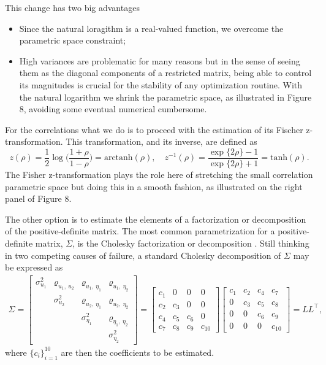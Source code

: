 This change has two big advantages
\begin{itemize}
 \item Since the natural loragithm is a real-valued function, we
       overcome the parametric space constraint;
 \item High variances are problematic for many reasons but in the sense
       of seeing them as the diagonal components of a restricted matrix,
       being able to control its magnitudes is crucial for the stability
       of any optimization routine. With the natural logarithm we shrink
       the parametric space, as illustrated in
       Figure 8, avoiding some eventual numerical cumbersome.
\end{itemize}
For the correlations what we do is to proceed with the estimation of its
Fischer z-transformation. This transformation, and its inverse, are
defined as
\[
 z(\rho) = \frac{1}{2}\log\Big(\frac{1+\rho}{1-\rho}\Big)
         = \text{arctanh}(\rho),\quad
 z^{-1}(\rho) = \frac{\exp\{2\rho\}-1}{\exp\{2\rho\}+1}
             = \text{tanh}(\rho).
\]
The Fisher z-transformation plays the role here of stretching the small
correlation parametric space but doing this in a smooth fashion, as
illustrated on the right panel of Figure 8.

The other option is to estimate the elements of a factorization or
decomposition of the positive-definite matrix. The most common
parametrization for a positive-definite matrix, \(\Sigma\), is the
Cholesky factorization or decomposition \cite{cholesky}. Still thinking
in two competing causes of failure, a standard Cholesky decomposition
of \(\Sigma\) may be expressed as
\begin{align*}
  \Sigma =
  \begin{bmatrix}
    \sigma_{u_{1}}^{2}&
    \varrho_{u_{1},~u_{2}}&
    \varrho_{u_{1},~\eta_{1}}&\varrho_{u_{1},~\eta_{2}}\\
    &\sigma_{u_{2}}^{2}&
    \varrho_{u_{2},~\eta_{1}}&\varrho_{u_{2},~\eta_{2}}\\
    &&\sigma_{\eta_{1}}^{2}&\varrho_{\eta_{1},~\eta_{2}}\\
    &&&\sigma_{\eta_{2}}^{2}
  \end{bmatrix} =
        \begin{bmatrix}
          c_{1}&0&0&0\\
          c_{2}&c_{3}&0&0\\
          c_{4}&c_{5}&c_{6}&0\\
          c_{7}&c_{8}&c_{9}&c_{10}
        \end{bmatrix}\begin{bmatrix}
          c_{1}&c_{2}&c_{4}&c_{7}\\
          0&c_{3}&c_{5}&c_{8}\\
          0&0&c_{6}&c_{9}\\
          0&0&0&c_{10}
        \end{bmatrix} = LL^{\top},
\end{align*}
where \(\{c_{i}\}_{i=1}^{10}\) are then the coefficients to be
estimated.

